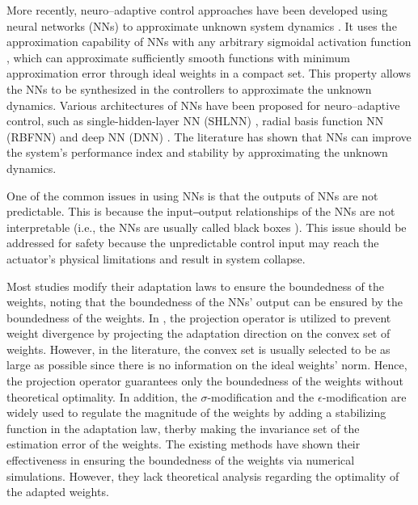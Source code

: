 \documentclass[letterpaper, 10 pt, conference]{ieeeconf}  %
\begin{document}
More recently, neuro–adaptive control approaches have been developed using neural networks (NNs) to approximate unknown system dynamics \cite{RN24}.
It uses the approximation capability of NNs with any arbitrary sigmoidal activation function \cite{RN35}, which can approximate sufficiently smooth functions with minimum approximation error through ideal weights in a compact set.
This property allows the NNs to be synthesized in the controllers to approximate the unknown dynamics.
Various architectures of NNs have been proposed for neuro–adaptive control, such as single-hidden-layer NN (SHLNN) \cite{RN16, RN18}, radial basis function NN (RBFNN) \cite{RN17, RN31} and deep NN (DNN) \cite{RN36}.
The literature has shown that NNs can improve the system's performance index and stability by approximating the unknown dynamics.


One of the common issues in using NNs is that the outputs of NNs are not predictable.
This is because the input‒output relationships of the NNs are not interpretable (i.e., the NNs are usually called black boxes \cite{RN8, RN9}).
This issue should be addressed for safety because the unpredictable control input may reach the actuator's physical limitations and result in system collapse.

Most studies modify their adaptation laws to ensure the boundedness of the weights, noting that the boundedness of the NNs' output can be ensured by the boundedness of the weights.
In \cite{RN31, RN36}, the projection operator is utilized to prevent weight divergence by projecting the adaptation direction on the convex set of weights.
However, in the literature, the convex set is usually selected to be as large as possible since there is no information on the ideal weights' norm.
Hence, the projection operator guarantees only the boundedness of the weights without theoretical optimality.
In addition, the $\sigma$-modification \cite{RN17} and the $\epsilon$-modification \cite{RN16, RN18} are widely used to regulate the magnitude of the weights by adding a stabilizing function in the adaptation law, therby making the invariance set of the estimation error of the weights. 
The existing methods have shown their effectiveness in ensuring the boundedness of the weights via numerical simulations.
However, they lack theoretical analysis regarding the optimality of the adapted weights.
\end{document}

